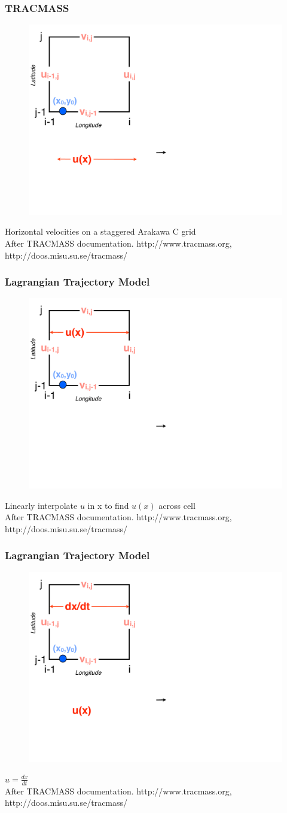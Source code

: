 \documentclass[ignorenonframetext]{beamer}
\begin{document}
\begin{frame}[t]\frametitle{TRACMASS}
	\begin{figure}[htbp]
		\centering
		\includegraphics[width=.5\textwidth]{figures/tracmass_box1}
	\end{figure}
	{\Large Horizontal velocities on a staggered Arakawa C grid}
	\tiny{\\After TRACMASS documentation. http://www.tracmass.org, http://doos.misu.su.se/tracmass/}
\end{frame}
\begin{frame}[t,noframenumbering]\frametitle{Lagrangian Trajectory Model}
	\begin{figure}[htbp]
		\centering
		\includegraphics[width=.5\textwidth]{figures/tracmass_box2}
	\end{figure}
	{\Large Linearly interpolate $u$ in x to find $u(x)$ across cell}
	\tiny{\\After TRACMASS documentation. http://www.tracmass.org, http://doos.misu.su.se/tracmass/}
\end{frame}
\begin{frame}[t,noframenumbering]\frametitle{Lagrangian Trajectory Model}
	\begin{figure}[htbp]
		\centering
		\includegraphics[width=.5\textwidth]{figures/tracmass_box3}
	\end{figure}
	{\Large $u=\frac{dx}{dt}$}
	\tiny{\\After TRACMASS documentation. http://www.tracmass.org, http://doos.misu.su.se/tracmass/}
\end{frame}
\end{document}
